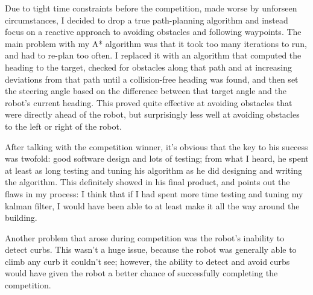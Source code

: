 
Due to tight time constraints before the competition, made worse by unforseen circumstances, I decided to drop a true path-planning algorithm and instead focus on a reactive approach to avoiding obstacles and following waypoints. The main problem with my A* algorithm was that it took too many iterations to run, and had to re-plan too often. I replaced it with an algorithm that computed the heading to the target, checked for obstacles along that path and at increasing deviations from that path until a collision-free heading was found, and then set the steering angle based on the difference between that target angle and the robot's current heading. This proved quite effective at avoiding obstacles that were directly ahead of the robot, but surprisingly less well at avoiding obstacles to the left or right of the robot.

After talking with the competition winner, it's obvious that the key to his success was twofold: good software design and lots of testing; from what I heard, he spent at least as long testing and tuning his algorithm as he did designing and writing the algorithm. This definitely showed in his final product, and points out the flaws in my process: I think that if I had spent more time testing and tuning my kalman filter, I would have been able to at least make it all the way around the building.


Another problem that arose during competition was the robot's inability to detect curbs. This wasn't a huge issue, because the robot was generally able to climb any curb it couldn't see; however, the ability to detect and avoid curbs would have given the robot a better chance of successfully completing the competition.
